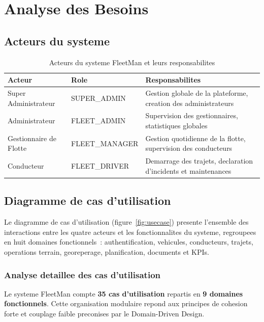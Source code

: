 \documentclass[12pt,a4paper]{report}
\begin{document}
\chapter{Analyse des Besoins}

\section{Acteurs du systeme}

\begin{table}[H]
\caption{Acteurs du systeme FleetMan et leurs responsabilites}
\label{tab:acteurs}
\centering
\begin{tabularx}{\textwidth}{p{3.5cm}p{3cm}X}
\toprule
\textbf{Acteur} & \textbf{Role} & \textbf{Responsabilites} \\
\midrule
Super Administrateur & SUPER\_ADMIN
  & Gestion globale de la plateforme, creation des administrateurs \\
Administrateur & FLEET\_ADMIN
  & Supervision des gestionnaires, statistiques globales \\
Gestionnaire de Flotte & FLEET\_MANAGER
  & Gestion quotidienne de la flotte, supervision des conducteurs \\
Conducteur & FLEET\_DRIVER
  & Demarrage des trajets, declaration d'incidents et maintenances \\
\bottomrule
\end{tabularx}
\end{table}

\section{Diagramme de cas d'utilisation}

Le diagramme de cas d'utilisation (figure~\ref{fig:usecase}) presente
l'ensemble des interactions entre les quatre acteurs et les fonctionnalites
du systeme, regroupees en huit domaines fonctionnels~: authentification,
vehicules, conducteurs, trajets, operations terrain, georeperage,
planification, documents et KPIs.

\subsection{Analyse detaillee des cas d'utilisation}

Le systeme FleetMan compte \textbf{35 cas d'utilisation} repartis en 
\textbf{9 domaines fonctionnels}. Cette organisation modulaire repond
aux principes de cohesion forte et couplage faible preconises par le
Domain-Driven Design.
\end{document}

